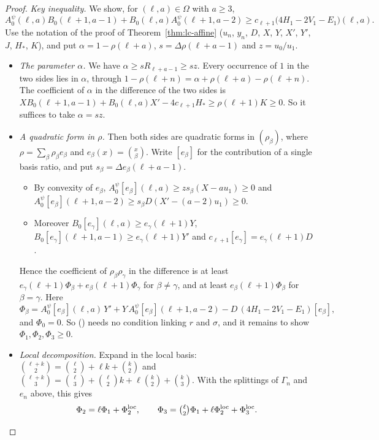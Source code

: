 \documentclass[twoside,10pt]{article}
\numberwithin{equation}{section}
\theoremstyle{slbody}
\theoremstyle{definition}
\theoremstyle{remark}
\renewcommand{\eqref}[1]{\textup{{\normalfont(\oldstylenums{\ref{#1}}}\normalfont)}}
\begin{document}
\begin{proof}
\emph{Key inequality.} We show, for $(\ell,a)\in\Omega$ with $a\geq3$,
\begin{equation}\label{eq:cubic-key}
A^\psi_0(\ell,a)B_0(\ell+1,a-1)+B_0(\ell,a)A^\psi_0(\ell+1,a-2)\geq c_{\ell+1}\bigl(4H_1-2V_1-E_1\bigr)(\ell,a).
\end{equation}
Use the notation of the proof of Theorem~\ref{thm:lc-affine} ($u_n$, $y_n$, $D$, $X$, $Y$, $X'$, $Y'$, $J$, $H_*$, $K$), and put $\alpha=1-\rho(\ell+a)$, $s=\Delta\rho(\ell+a-1)$ and $z=u_0/u_1$.
\begin{itemize}
\item \emph{The parameter $\alpha$.} We have $\alpha\geq sR_{\ell+a-1}\geq sz$. Every occurrence of $1$ in the two sides lies in $\alpha$, through $1-\rho(\ell+n)=\alpha+\rho(\ell+a)-\rho(\ell+n)$. The coefficient of $\alpha$ in the difference of the two sides is $XB_0(\ell+1,a-1)+B_0(\ell,a)X'-4c_{\ell+1}H_*\geq\rho(\ell+1)K\geq0$. So it suffices to take $\alpha=sz$.
\item \emph{A quadratic form in $\rho$.} Then both sides are quadratic forms in $(\rho_\beta)$, where $\rho=\sum_\beta\rho_\beta e_\beta$ and $e_\beta(x)=\binom x\beta$. Write $[e_\beta]$ for the contribution of a single basis ratio, and put $s_\beta=\Delta e_\beta(\ell+a-1)$.
  \begin{itemize}
  \item By convexity of $e_\beta$, $A^\psi_0[e_\beta](\ell,a)\geq zs_\beta(X-au_1)\geq0$ and $A^\psi_0[e_\beta](\ell+1,a-2)\geq s_\beta D(X'-(a-2)u_1)\geq0$.
  \item Moreover $B_0[e_\gamma](\ell,a)\geq e_\gamma(\ell+1)Y$, $B_0[e_\gamma](\ell+1,a-1)\geq e_\gamma(\ell+1)Y'$ and $c_{\ell+1}[e_\gamma]=e_\gamma(\ell+1)D$.
  \end{itemize}
  Hence the coefficient of $\rho_\beta\rho_\gamma$ in the difference is at least $e_\gamma(\ell+1)\Phi_\beta+e_\beta(\ell+1)\Phi_\gamma$ for $\beta\neq\gamma$, and at least $e_\beta(\ell+1)\Phi_\beta$ for $\beta=\gamma$. Here
\[
\Phi_\beta=A^\psi_0[e_\beta](\ell,a)\,Y'+Y\,A^\psi_0[e_\beta](\ell+1,a-2)-D\,(4H_1-2V_1-E_1)[e_\beta],
\]
and $\Phi_0=0$. So \eqref{eq:cubic-key} needs no condition linking $r$ and $\sigma$, and it remains to show $\Phi_1,\Phi_2,\Phi_3\geq0$.
\item \emph{Local decomposition.} Expand in the local basis: $\binom{\ell+k}2=\binom\ell2+\ell k+\binom k2$ and $\binom{\ell+k}3=\binom\ell3+\binom\ell2k+\ell\binom k2+\binom k3$. With the splittings of $\Gamma_n$ and $e_n$ above, this gives
\[
\Phi_2=\ell\Phi_1+\Phi_2^{\mathrm{loc}},\qquad\Phi_3=\tbinom\ell2\Phi_1+\ell\Phi_2^{\mathrm{loc}}+\Phi_3^{\mathrm{loc}}.
\]
\end{itemize}
\end{proof}
\end{document}
